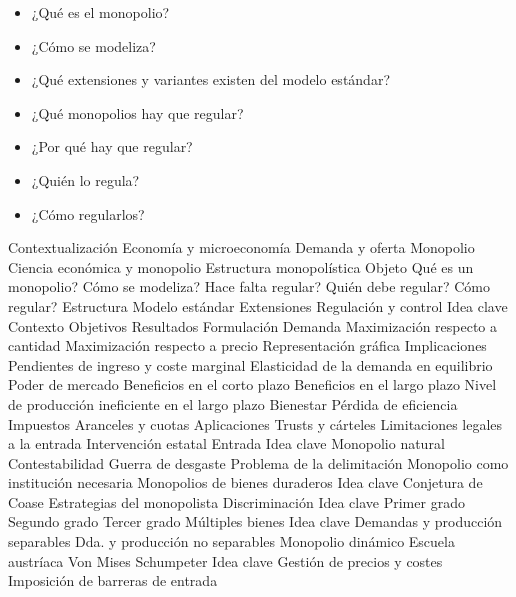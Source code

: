 \documentclass{nuevotema}
\begin{document}
\begin{itemize}
	\item ¿Qué es el monopolio?
	\item ¿Cómo se modeliza?
	\item ¿Qué extensiones y variantes existen del modelo estándar?
	\item ¿Qué monopolios hay que regular?
	\item ¿Por qué hay que regular?
	\item ¿Quién lo regula?
	\item ¿Cómo regularlos?
\end{itemize}

\esquemacorto

\begin{esquema}[enumerate]
	\1[] 
		\2 Contextualización
			\3 Economía y microeconomía
			\3 Demanda y oferta
			\3 Monopolio
			\3 Ciencia económica y monopolio
			\3 Estructura monopolística
		\2 Objeto
			\3 Qué es un monopolio?
			\3 Cómo se modeliza?
			\3 Hace falta regular?
			\3 Quién debe regular?
			\3 Cómo regular?
		\2 Estructura
			\3 Modelo estándar
			\3 Extensiones
			\3 Regulación y control
	\1 
		\2 Idea clave
			\3 Contexto
			\3 Objetivos
			\3 Resultados
		\2 Formulación
			\3 Demanda
			\3 Maximización respecto a cantidad
			\3 Maximización respecto a precio
			\3 Representación gráfica
		\2 Implicaciones
			\3 Pendientes de ingreso y coste marginal
			\3 Elasticidad de la demanda en equilibrio
			\3 Poder de mercado
			\3 Beneficios en el corto plazo
			\3 Beneficios en el largo plazo
			\3 Nivel de producción ineficiente en el largo plazo
			\3 Bienestar
			\3 Pérdida de eficiencia
			\3 Impuestos
			\3 Aranceles y cuotas
		\2 Aplicaciones
			\3 Trusts y cárteles
			\3 Limitaciones legales a la entrada
			\3 Intervención estatal
	\1 
		\2 Entrada
			\3 Idea clave
			\3 Monopolio natural
			\3 Contestabilidad
			\3 Guerra de desgaste
			\3 Problema de la delimitación
			\3 Monopolio como institución necesaria
		\2 Monopolios de bienes duraderos
			\3 Idea clave
			\3 Conjetura de Coase
			\3 Estrategias del monopolista
		\2 Discriminación
			\3 Idea clave
			\3 Primer grado
			\3 Segundo grado
			\3 Tercer grado
		\2 Múltiples bienes
			\3 Idea clave
			\3 Demandas y producción separables
			\3 Dda. y producción no separables
			\3 Monopolio dinámico
		\2 Escuela austríaca
			\3 Von Mises
			\3 Schumpeter
	\1 
		\2 Idea clave
			\3 Gestión de precios y costes
			\3 Imposición de barreras de entrada

\end{esquema}
\end{document}

